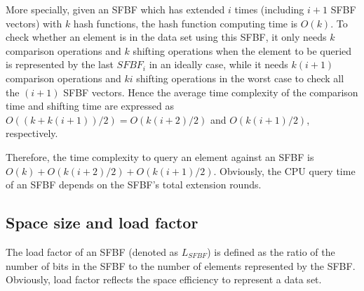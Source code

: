 \documentclass[10pt,journal,letterpaper]{IEEEtran}
\newcommand{\note}[1]{{\sffamily\itshape\bfseries\uline{#1}}}
\begin{document}
More specially, given an SFBF which has extended $i$ times (including $i+1$ SFBF vectors) with $k$ hash functions, the hash function computing time is $O(k)$. To check whether an element is in the data set using this SFBF, it only needs $k$ comparison operations and $k$ shifting operations when the element to be queried is represented by the last $SFBF_i$ in an ideally case, while it needs $k(i+1)$ comparison operations and $ki$ shifting operations in the worst case to check all the $(i+1)$ SFBF vectors. Hence the average time complexity of the comparison time and shifting time are expressed as
$O((k+k(i+1))/2)=O(k(i+2)/2)$ and $O(k(i+1)/2)$, respectively.


Therefore, the time complexity to query an element against an SFBF is $O(k)+O(k(i+2)/2)+O(k(i+1)/2)$.
Obviously, the CPU query time of an SFBF depends on the SFBF's total extension rounds.

\subsection{Space size and load factor}
The load factor of an SFBF (denoted as $L_{SFBF}$) is defined as the ratio of the number of bits in the SFBF to the number of elements represented by the SFBF.
Obviously, load factor reflects the space efficiency to represent a data set.
\end{document}
